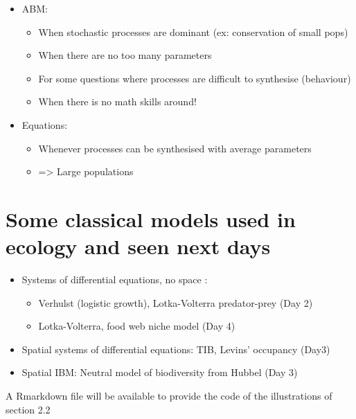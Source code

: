 \documentclass[
]{book}
\providecommand{\tightlist}{%
  \setlength{\itemsep}{0pt}\setlength{\parskip}{0pt}}
\theoremstyle{definition}
\theoremstyle{definition}
\theoremstyle{definition}
\theoremstyle{definition}
\theoremstyle{remark}
\begin{document}
\begin{itemize}
  \begin{itemize}
  \tightlist
  \item
    ABM:

    \begin{itemize}
    \tightlist
    \item
      When stochastic processes are dominant (ex: conservation of small pops)
    \item
      When there are no too many parameters
    \item
      For some questions where processes are difficult to synthesise (behaviour)
    \item
      When there is no math skills around!
    \end{itemize}
  \item
    Equations:

    \begin{itemize}
    \tightlist
    \item
      Whenever processes can be synthesised with average parameters
    \item
      =\textgreater{} Large populations
    \end{itemize}
  \end{itemize}
\end{itemize}

\section{Some classical models used in ecology and seen next days}\label{some-classical-models-used-in-ecology-and-seen-next-days}

\begin{itemize}
\tightlist
\item
  Systems of differential equations, no space :

  \begin{itemize}
  \tightlist
  \item
    Verhulst (logistic growth), Lotka-Volterra predator-prey (Day 2)
  \item
    Lotka-Volterra, food web niche model (Day 4)
  \end{itemize}
\item
  Spatial systems of differential equations: TIB, Levins' occupancy (Day3)
\item
  Spatial IBM: Neutral model of biodiversity from Hubbel (Day 3)
\end{itemize}

A Rmarkdown file will be available to provide the code of the illustrations of section 2.2
\end{document}
